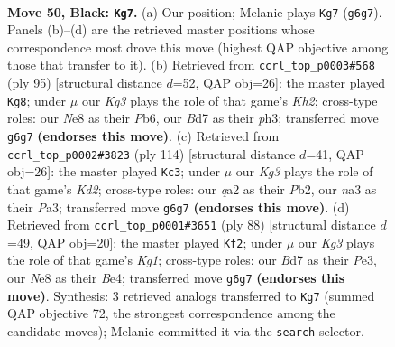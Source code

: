 \documentclass[11pt]{article}
\begin{document}
\clearpage

\begin{figure}[p]\centering
\begin{subfigure}{0.46\textwidth}\centering
\resizebox{\linewidth}{!}{%
\newchessgame
\chessboard[
  setfen={4n3/3b4/p5k1/3PPp1p/6p1/N7/Q4P2/5KNq b - - 4 50},
  showmover=false,
  pgfstyle=straightmove, color=movearrow, markmove={g6-g7}
]}
\caption{}
\end{subfigure}\hfill
\begin{subfigure}{0.46\textwidth}\centering
\resizebox{\linewidth}{!}{%
\newchessgame
\chessboard[
  setfen={8/5qpk/1p4np/8/P3Q1P1/5N1P/5K2/8 b - - 5 48},
  showmover=false,
  pgfstyle=straightmove, color=movearrow, markmove={h7-g8}
]}
\caption{}
\end{subfigure}
\\[4pt]
\begin{subfigure}{0.46\textwidth}\centering
\resizebox{\linewidth}{!}{%
\newchessgame
\chessboard[
  setfen={7k/5qp1/p7/1pB1Qn1p/8/P6P/1P1K1P2/8 w - - 26 58},
  showmover=false,
  pgfstyle=straightmove, color=movearrow, markmove={d2-c3}
]}
\caption{}
\end{subfigure}\hfill
\begin{subfigure}{0.46\textwidth}\centering
\resizebox{\linewidth}{!}{%
\newchessgame
\chessboard[
  setfen={8/6kp/3pq3/4n1p1/4B3/4P2P/1Q4P1/6K1 w - - 0 45},
  showmover=false,
  pgfstyle=straightmove, color=movearrow, markmove={g1-f2}
]}
\caption{}
\end{subfigure}
\caption{\textbf{Move 50, Black: \texttt{Kg7}.} (a) Our position; Melanie plays \texttt{Kg7} (\texttt{g6g7}). Panels (b)--(d) are the retrieved master positions whose correspondence most drove this move (highest QAP objective among those that transfer to it). (b) Retrieved from \texttt{ccrl\_top\_p0003\#568} (ply 95) [structural distance $d$=52, QAP obj=26]: the master played \texttt{Kg8}; under $\mu$ our \emph{Kg3} plays the role of that game's \emph{Kh2}; cross-type roles: our \emph{N}e8 as their \emph{P}b6, our \emph{B}d7 as their \emph{p}h3; transferred move \texttt{g6g7} \textbf{(endorses this move)}. (c) Retrieved from \texttt{ccrl\_top\_p0002\#3823} (ply 114) [structural distance $d$=41, QAP obj=26]: the master played \texttt{Kc3}; under $\mu$ our \emph{Kg3} plays the role of that game's \emph{Kd2}; cross-type roles: our \emph{q}a2 as their \emph{P}b2, our \emph{n}a3 as their \emph{P}a3; transferred move \texttt{g6g7} \textbf{(endorses this move)}. (d) Retrieved from \texttt{ccrl\_top\_p0001\#3651} (ply 88) [structural distance $d$=49, QAP obj=20]: the master played \texttt{Kf2}; under $\mu$ our \emph{Kg3} plays the role of that game's \emph{Kg1}; cross-type roles: our \emph{B}d7 as their \emph{P}e3, our \emph{N}e8 as their \emph{B}e4; transferred move \texttt{g6g7} \textbf{(endorses this move)}. Synthesis: 3 retrieved analogs transferred to \texttt{Kg7} (summed QAP objective 72, the strongest correspondence among the candidate moves); Melanie committed it via the \texttt{search} selector.}
\label{fig:thought-m99}
\end{figure}
\end{document}

